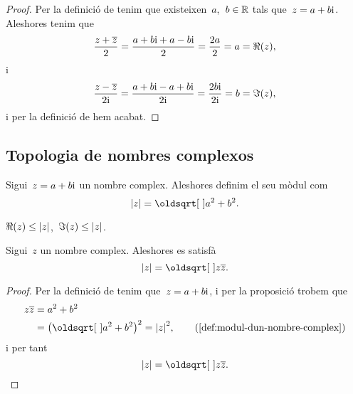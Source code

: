 \documentclass[../../main.tex]{subfiles}
\begin{document}
    \begin{proof}
        Per la definició de  tenim que
        existeixen~\(a\),~\(b\in\mathbb{R}\) tals que~\(z = a+b\mathrm{i}\).
        Aleshores tenim que
        \[
            \frac{z+\overline{z}}{2} = \frac{a+b\mathrm{i}+a-b\mathrm{i}}{2}
                                     = \frac{2a}{2} = a = \Re(z),
        \]
        i
        \[
            \frac{z-\overline{z}}{2\mathrm{i}} = \frac{a+b\mathrm{i}-a+b\mathrm{i}}{2\mathrm{i}}
                                        = \frac{2b\mathrm{i}}{2\mathrm{i}} = b = \Im(z),
        \]
        i per la definició
        de  hem
        acabat.
    \end{proof}
    \subsection{Topologia de nombres complexos}
    \begin{definition}
        \label{def:modul-dun-nombre-complex}
        Sigui~\(z = a+b\mathrm{i}\) un nombre complex.
        Aleshores definim el seu mòdul com
        \[
            \modul{z} = \sqrt{a^{2}+b^{2}}.
        \]
    \end{definition}
    \begin{observation}
        \label{obs:les-parts-real-i-imaginaries-dun-complex-son-menors-que-el-seu-modul}
        \label{obs:la-part-real-dun-complex-es-menor-que-el-seu-modul}
        \label{obs:la-part-imaginaria-dun-complex-es-menor-que-el-seu-modul}
        \(\Re(z) \leq \modul{z}\),~\(\Im(z) \leq \modul{z}\).
    \end{observation}
    \begin{proposition}
        \label{prop:el-modul-dun-nombre-complex-es-larrel-del-nombre-pel-seu-conjugat}
        Sigui~\(z\) un nombre complex.
        Aleshores es satisfà
        \[
            \modul{z} = \sqrt{z\conjugat{z}}.
        \]
    \end{proposition}
    \begin{proof}
        Per la definició de  tenim
        que~\(z = a+b\mathrm{i}\), i per la
        proposició 
        trobem que
        \begin{align*}
            z\conjugat{z} &= a^{2}+b^{2} \\
                          &= \big(\sqrt{a^{2}+b^{2}}\big)^{2}
                           = \modul{z}^{2},
                          \tag{\ref{def:modul-dun-nombre-complex}}
        \end{align*}
        i per tant
        \[
            \modul{z} = \sqrt{z\conjugat{z}}.\qedhere
        \]
    \end{proof}
\end{document}
